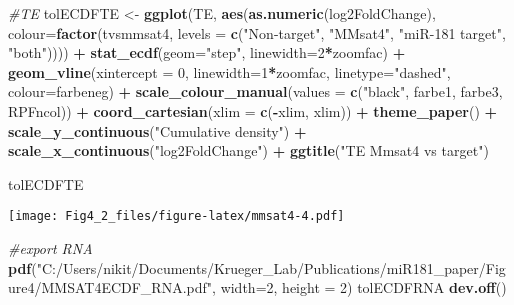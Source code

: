 \documentclass[
]{article}
\newenvironment{Shaded}{\begin{snugshade}}{\end{snugshade}}
\newcommand{\AttributeTok}[1]{\textcolor[rgb]{0.13,0.29,0.53}{#1}}
\newcommand{\CommentTok}[1]{\textcolor[rgb]{0.56,0.35,0.01}{\textit{#1}}}
\newcommand{\DecValTok}[1]{\textcolor[rgb]{0.00,0.00,0.81}{#1}}
\newcommand{\FunctionTok}[1]{\textcolor[rgb]{0.13,0.29,0.53}{\textbf{#1}}}
\newcommand{\NormalTok}[1]{#1}
\newcommand{\OtherTok}[1]{\textcolor[rgb]{0.56,0.35,0.01}{#1}}
\newcommand{\SpecialCharTok}[1]{\textcolor[rgb]{0.81,0.36,0.00}{\textbf{#1}}}
\newcommand{\StringTok}[1]{\textcolor[rgb]{0.31,0.60,0.02}{#1}}
\begin{document}
\begin{Shaded}
\begin{Highlighting}[]
\CommentTok{\#TE}
\NormalTok{tolECDFTE }\OtherTok{\textless{}{-}} \FunctionTok{ggplot}\NormalTok{(TE, }\FunctionTok{aes}\NormalTok{(}\FunctionTok{as.numeric}\NormalTok{(log2FoldChange), }\AttributeTok{colour=}\FunctionTok{factor}\NormalTok{(tvsmmsat4, }\AttributeTok{levels =} \FunctionTok{c}\NormalTok{(}\StringTok{"Non{-}target"}\NormalTok{, }\StringTok{"MMsat4"}\NormalTok{, }\StringTok{"miR{-}181 target"}\NormalTok{, }\StringTok{"both"}\NormalTok{)))) }\SpecialCharTok{+} 
  \FunctionTok{stat\_ecdf}\NormalTok{(}\AttributeTok{geom=}\StringTok{"step"}\NormalTok{, }\AttributeTok{linewidth=}\DecValTok{2}\SpecialCharTok{*}\NormalTok{zoomfac) }\SpecialCharTok{+}
  \FunctionTok{geom\_vline}\NormalTok{(}\AttributeTok{xintercept =} \DecValTok{0}\NormalTok{, }\AttributeTok{linewidth=}\DecValTok{1}\SpecialCharTok{*}\NormalTok{zoomfac, }\AttributeTok{linetype=}\StringTok{"dashed"}\NormalTok{, }\AttributeTok{colour=}\NormalTok{farbeneg) }\SpecialCharTok{+}
  \FunctionTok{scale\_colour\_manual}\NormalTok{(}\AttributeTok{values =} \FunctionTok{c}\NormalTok{(}\StringTok{"black"}\NormalTok{, farbe1, farbe3, RPFncol)) }\SpecialCharTok{+}
  \FunctionTok{coord\_cartesian}\NormalTok{(}\AttributeTok{xlim =} \FunctionTok{c}\NormalTok{(}\SpecialCharTok{{-}}\NormalTok{xlim, xlim)) }\SpecialCharTok{+} 
  \FunctionTok{theme\_paper}\NormalTok{() }\SpecialCharTok{+}
  \FunctionTok{scale\_y\_continuous}\NormalTok{(}\StringTok{"Cumulative density"}\NormalTok{) }\SpecialCharTok{+} \FunctionTok{scale\_x\_continuous}\NormalTok{(}\StringTok{"log2FoldChange"}\NormalTok{) }\SpecialCharTok{+}
  \FunctionTok{ggtitle}\NormalTok{(}\StringTok{"TE Mmsat4 vs target"}\NormalTok{)}

\NormalTok{tolECDFTE}
\end{Highlighting}
\end{Shaded}

\texttt{[image: Fig4\_2\_files/figure-latex/mmsat4-4.pdf]}

\begin{Shaded}
\begin{Highlighting}[]
\CommentTok{\#export RNA}
\FunctionTok{pdf}\NormalTok{(}\StringTok{"C:/Users/nikit/Documents/Krueger\_Lab/Publications/miR181\_paper/Figure4/MMSAT4ECDF\_RNA.pdf"}\NormalTok{, }\AttributeTok{width=}\DecValTok{2}\NormalTok{, }\AttributeTok{height =} \DecValTok{2}\NormalTok{)}
\NormalTok{tolECDFRNA}
\FunctionTok{dev.off}\NormalTok{()}
\end{Highlighting}
\end{Shaded}
\end{document}
